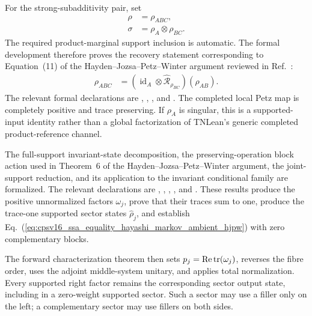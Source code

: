 \documentclass[11pt]{article}
\begin{document}
For the strong-subadditivity pair, set
\begin{align}
    \rho
        &=\rho_{ABC},
    \label{eq:cpsv16_ssa_equality_hayashi_markov_ssa_state}\\
    \sigma
        &=\rho_A\otimes\rho_{BC}.
    \label{eq:cpsv16_ssa_equality_hayashi_markov_ssa_reference}
\end{align}
The required product-marginal support inclusion is automatic. The formal
development therefore proves the recovery statement corresponding to
Equation~(11) of the Hayden--Jozsa--Petz--Winter argument reviewed in
Ref.~\cite{Cirac2021Matrix}:
\begin{align}
    \rho_{ABC}
        &=
        \left(\operatorname{id}_A\otimes
            \widehat{\mathcal R}_{\rho_{BC}}\right)(\rho_{AB}).
    \label{eq:cpsv16_ssa_equality_hayashi_markov_hjpw_recovery_identity}
\end{align}
The relevant formal declarations are
,
,
, and
.
The completed local Petz map is completely positive and trace preserving. If
$\rho_A$ is singular, this is a supported-input identity rather than a global
factorization of TNLean's generic completed product-reference channel.

The full-support invariant-state decomposition, the preserving-operation block
action used in Theorem~6 of the Hayden--Jozsa--Petz--Winter argument, the
joint-support reduction, and its application to the invariant conditional
family are formalized. The relevant declarations are
,
,
,
, and
. These results produce the
positive unnormalized factors $\omega_j$, prove that their traces sum to one,
produce the trace-one supported sector states $\widehat\rho_j$, and establish
Eq.~(\ref{eq:cpsv16_ssa_equality_hayashi_markov_ambient_hjpw}) with zero
complementary blocks.

The forward characterization theorem
 then sets
$p_j=\operatorname{Re}\operatorname{tr}(\omega_j)$, reverses the fibre order, uses the
adjoint middle-system unitary, and applies total normalization. Every supported
right factor remains the corresponding sector output state, including in a
zero-weight supported sector. Such a sector may use a filler only on the left;
a complementary sector may use fillers on both sides.
\end{document}
